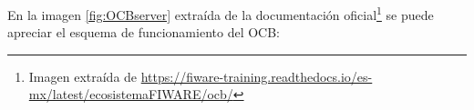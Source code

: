 En la imagen \ref{fig:OCBserver} extraída de la documentación oficial\footnote{Imagen extraída de \url{https://fiware-training.readthedocs.io/es-mx/latest/ecosistemaFIWARE/ocb/}} se puede apreciar el esquema de funcionamiento del OCB:


\begin{comment}
En aquellos proyectos que necesiten para su comprensión y desarrollo de unos conceptos teóricos de una determinada materia o de un determinado dominio de conocimiento, debe existir un apartado que sintetice dichos conceptos.

Algunos conceptos teóricos de \LaTeX{} \footnote{Créditos a los proyectos de Álvaro López Cantero: Configurador de Presupuestos y Roberto Izquierdo Amo: PLQuiz}.


Las secciones se incluyen con el comando section.

\subsection{Subsecciones}

Además de secciones tenemos subsecciones.

\subsubsection{Subsubsecciones}

Y subsecciones. 


\section{Referencias}

Las referencias se incluyen en el texto usando cite~\cite{wiki:latex}. Para citar webs, artículos o libros~\cite{koza92}, si se desean citar más de uno en el mismo lugar~\cite{bortolot2005, koza92}.


\section{Imágenes}

Se pueden incluir imágenes con los comandos standard de \LaTeX, pero esta plantilla dispone de comandos propios como por ejemplo el siguiente:


\end{comment}
